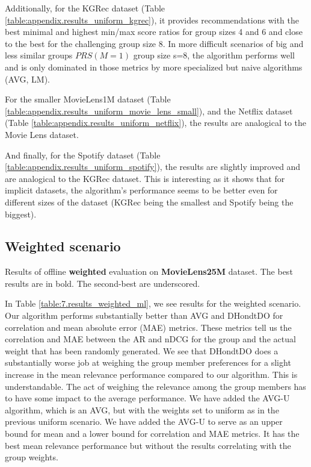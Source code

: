 Additionally, for the KGRec dataset (Table \ref{table:appendix.results_uniform_kgrec}), it provides recommendations with the best minimal and highest min/max score ratios for group sizes 4 and 6 and close to the best for the challenging group size 8. In more difficult scenarios of big and less similar groups $PRS(M=1)$ group size s=8, the algorithm performs well and is only dominated in those metrics by more specialized but naive algorithms (AVG, LM).

For the smaller MovieLens1M dataset (Table \ref{table:appendix.results_uniform_movie_lens_small}), and the Netflix dataset (Table \ref{table:appendix.results_uniform_netflix}), the results are analogical to the Movie Lens dataset.

And finally, for the Spotify dataset (Table \ref{table:appendix.results_uniform_spotify}), the results are slightly improved and are analogical to the KGRec dataset. This is interesting as it shows that for implicit datasets, the algorithm's performance seems to be better even for different sizes of the dataset (KGRec being the smallest and Spotify being the biggest).



\subsection{Weighted scenario}

\begin{table}[!ht]
    \centering
    \scalebox{0.82}{\hspace*{-1.2cm}{
        
    }}\hspace*{-1.3cm}
    \caption[Results of offline weighted evaluation on Movie Lens dataset]{Results of offline \textbf{weighted} evaluation on \textbf{MovieLens25M} dataset. The best results are in bold. The second-best are underscored.}
    \label{table:7.results_weighted_ml}
\end{table}

In Table \ref{table:7.results_weighted_ml}, we see results for the weighted scenario. Our algorithm performs substantially better than AVG and DHondtDO for correlation and mean absolute error (MAE) metrics. These metrics tell us the correlation and MAE between the AR and nDCG for the group and the actual weight that has been randomly generated. We see that DHondtDO does a substantially worse job at weighing the group member preferences for a slight increase in the mean relevance performance compared to our algorithm. This is understandable. The act of weighing the relevance among the group members has to have some impact to the average performance. We have added the AVG-U algorithm, which is an AVG, but with the weights set to uniform as in the previous uniform scenario. We have added the AVG-U to serve as an upper bound for mean and a lower bound for correlation and MAE metrics. It has the best mean relevance performance but without the results correlating with the group weights.

